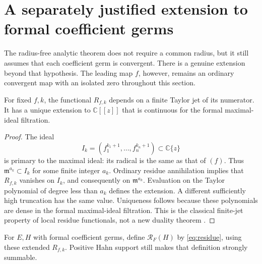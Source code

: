 \documentclass[11pt,letterpaper]{article}
\theoremstyle{definition}
\theoremstyle{remark}
\newcommand{\C}{\mathbb C}\newcommand{\R}{\mathbb R}
\newcommand{\m}{\mathfrak m}\newcommand{\Res}{\operatorname{Res}}
\numberwithin{equation}{section}
\begin{document}
\section{A separately justified extension to formal coefficient germs}
\label{sec:formal}

The radius-free analytic theorem does not require a common radius, but it
still assumes that each coefficient germ is convergent. There is a genuine
extension beyond that hypothesis. The leading map $f$, however, remains an
ordinary convergent map with an isolated zero throughout this section.

\begin{lemma}\label{lem:finitejet}
For fixed $f,k$, the functional $R_{f,k}$ depends on a finite Taylor jet of
its numerator. It has a unique extension to $\C[[z]]$ that is continuous
for the formal maximal-ideal filtration.
\end{lemma}
\begin{proof}
The ideal
\[
 I_k=(f_1^{k_1+1},\ldots,f_n^{k_n+1})\subset\C\{z\}
\]
is primary to the maximal ideal: its radical is the same as that of $(f)$.
Thus $\m^{a_k}\subset I_k$ for some finite integer $a_k$. Ordinary residue
annihilation implies that $R_{f,k}$ vanishes on $I_k$, and consequently on
$\m^{a_k}$. Evaluation on the Taylor polynomial of degree less than $a_k$
defines the extension. A different sufficiently high truncation has the same
value. Uniqueness follows because these polynomials are dense in the formal
maximal-ideal filtration. This is the classical finite-jet property of local
residue functionals, not a new duality theorem \cite{GH,TN}.
\end{proof}

For $E,H$ with formal coefficient germs, define $\mathcal R_F(H)$ by
\eqref{eq:residue}, using these extended $R_{f,k}$. Positive Hahn support
still makes that definition strongly summable.
\end{document}
